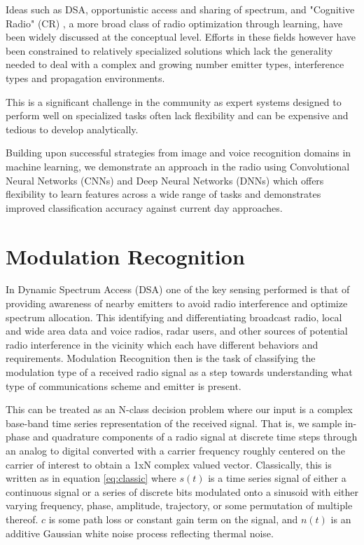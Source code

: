 \documentclass[runningheads,a4paper]{llncs}
\begin{document}
Ideas such as DSA, opportunistic access and sharing of spectrum, and "Cognitive Radio" (CR) \cite{cograd}, a more broad class of radio optimization through learning, have been widely discussed at the conceptual level.  Efforts in these fields however have been constrained to relatively specialized solutions which lack the generality needed to deal with a complex and growing number emitter types, interference types and propagation environments.   \cite{cumcr} \cite{mlcrn} \cite{rondeau}

This is a significant challenge in the community as expert systems designed to perform well on specialized tasks often lack flexibility and can be expensive and tedious to develop analytically.

Building upon successful strategies from image and voice recognition domains in machine learning, we demonstrate an approach in the radio using Convolutional Neural Networks (CNNs) and Deep Neural Networks (DNNs) which offers flexibility to learn features across a wide range of tasks and demonstrates improved classification accuracy against current day approaches.

\section{Modulation Recognition}
In Dynamic Spectrum Access (DSA) one of the key sensing performed is that of providing awareness of nearby emitters to avoid radio interference and optimize spectrum allocation.  This identifying and differentiating broadcast radio, local and wide area data and voice radios, radar users, and other sources of potential radio interference in the vicinity which each have different behaviors and requirements.  Modulation Recognition then is the task of classifying the modulation type of a received radio signal as a step towards understanding what type of communications scheme and emitter is present.   

This can be treated as an N-class decision problem where our input is a complex base-band time series representation of the received signal.  That is, we sample in-phase and quadrature components of a radio signal at discrete time steps through an analog to digital converted with a carrier frequency roughly centered on the carrier of interest to obtain a 1xN complex valued vector.  Classically, this is written as in equation \ref{eq:classic} where $s(t)$ is a time series signal of either a continuous signal or a series of discrete bits modulated onto a sinusoid with either varying frequency, phase, amplitude, trajectory, or some permutation of multiple thereof.  $c$ is some path loss or constant gain term on the signal, and $n(t)$ is an additive Gaussian white noise process reflecting thermal noise.
\end{document}
